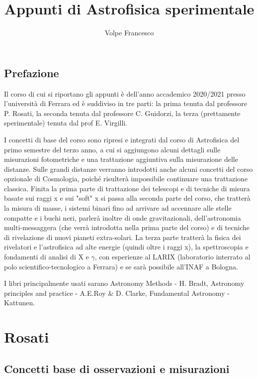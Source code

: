 \documentclass[a4paper,twoside,openany,notitlepage]{book}
\theoremstyle{definition}
\theoremstyle{plain}
\begin{document}
\frontmatter
\author{Volpe Francesco}
\title{Appunti di Astrofisica sperimentale}
\date{}
\maketitle

\pagestyle{plain}
\tableofcontents

\chapter*{Prefazione}

Il corso di cui si riportano gli appunti è dell'anno accademico 2020/2021 presso l'università di Ferrara ed è suddiviso in tre parti: la prima tenuta dal professore P. Rosati, la seconda tenuta dal professore C. Guidorzi, la terza (prettamente sperimentale) tenuta dal prof E. Virgilli.

I concetti di base del corso sono ripresi e integrati dal corso di Astrofisica del primo semestre del terzo anno, a cui si aggiungono alcuni dettagli sulle misurazioni fotometriche e una trattazione aggiuntiva sulla misurazione delle distanze. Sulle grandi distanze verranno introdotti anche alcuni concetti del corso opzionale di Cosmologia, poiché risulterà impossibile continuare una trattazione classica. Finita la prima parte di trattazione dei telescopi e di tecniche di misura basate sui raggi x e sui "soft" x si passa alla seconda parte del corso, che tratterà la misura di masse, i sistemi binari fino ad arrivare ad accennare alle stelle compatte e i buchi neri, parlerà inoltre di onde gravitazionali, dell'astronomia multi-messaggera (che verrà introdotta nella prima parte del corso) e di tecniche di rivelazione di nuovi pianeti extra-solari. La terza parte tratterà la fisica dei rivelatori e l'astrofisica ad alte energie (quindi oltre i raggi x), la spettroscopia e fondamenti di analisi di X e $\gamma$, con esperienze al LARIX (laboratorio interrato al polo scientifico-tecnologico a Ferrara) e se sarà possibile all'INAF a Bologna.

I libri principalmente usati sarano Astronomy Methods - H. Bradt, Astronomy principles and practice - A.E.Roy \& D. Clarke, Fundamental Astronomy - Kattunen.

\mainmatter

\part{Rosati}

\chapter{Concetti base di osservazioni e misurazioni}
\end{document}
